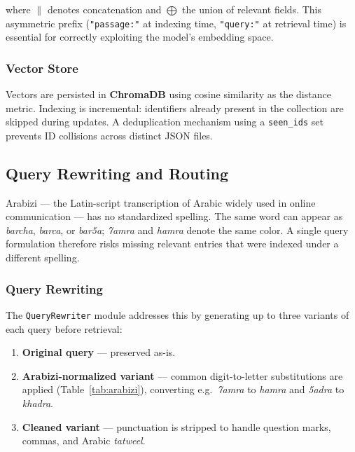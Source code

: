 \noindent where $\|$ denotes concatenation and $\bigoplus$ the union of relevant fields.
This asymmetric prefix (\texttt{"passage:"} at indexing time, \texttt{"query:"} at
retrieval time) is essential for correctly exploiting the model's embedding space.

\subsubsection{Vector Store}

Vectors are persisted in \textbf{ChromaDB} using cosine similarity as the distance
metric. Indexing is incremental: identifiers already present in the collection are
skipped during updates. A deduplication mechanism using a \texttt{seen\_ids} set
prevents ID collisions across distinct JSON files.

\subsection{Query Rewriting and Routing}
\label{subsec:rewriting}

Arabizi --- the Latin-script transcription of Arabic widely used in online communication ---
has no standardized spelling. The same word can appear as \textit{barcha},
\textit{barca}, or \textit{bar5a}; \textit{7amra} and \textit{hamra} denote the same
color. A single query formulation therefore risks missing relevant entries that were
indexed under a different spelling.

\subsubsection{Query Rewriting}

The \texttt{QueryRewriter} module addresses this by generating up to three variants
of each query before retrieval:

\begin{enumerate}
    \item \textbf{Original query} --- preserved as-is.
    \item \textbf{Arabizi-normalized variant} --- common digit-to-letter substitutions
    are applied (Table~\ref{tab:arabizi}), converting e.g.\ \textit{7amra} to
    \textit{hamra} and \textit{5adra} to \textit{khadra}.
    \item \textbf{Cleaned variant} --- punctuation is stripped to handle
    question marks, commas, and Arabic \textit{tatweel}.
\end{enumerate}

